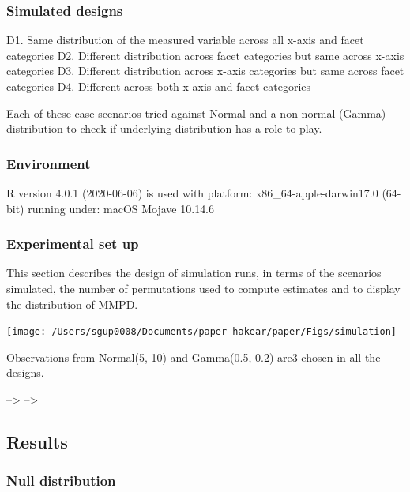 \documentclass[
]{article}
\begin{document}
\hypertarget{simulated-designs}{%
\subsubsection{Simulated designs}\label{simulated-designs}}

D1. Same distribution of the measured variable across all x-axis and facet categories
D2. Different distribution across facet categories but same across x-axis categories
D3. Different distribution across x-axis categories but same across facet categories
D4. Different across both x-axis and facet categories

Each of these case scenarios tried against Normal and a non-normal (Gamma) distribution to check if underlying distribution has a role to play.

\hypertarget{environment}{%
\subsubsection{Environment}\label{environment}}

R version 4.0.1 (2020-06-06) is used with platform: x86\_64-apple-darwin17.0 (64-bit) running under: macOS Mojave 10.14.6

\hypertarget{experimental-set-up}{%
\subsubsection{Experimental set up}\label{experimental-set-up}}

This section describes the design of simulation runs, in terms of the scenarios simulated, the number of permutations used to compute estimates and to display the distribution of MMPD.

\begin{center}\texttt{[image: /Users/sgup0008/Documents/paper-hakear/paper/Figs/simulation]} \end{center}

Observations from Normal(5, 10) and Gamma(0.5, 0.2) are3 chosen in all the designs.

--\textgreater{}
--\textgreater{}

\hypertarget{results}{%
\subsection{Results}\label{results}}

\hypertarget{null-distribution}{%
\subsubsection{Null distribution}\label{null-distribution}}
\end{document}
